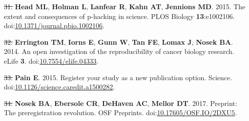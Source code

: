 \documentclass[]{article}
\providecommand{\DIFaddtex}[1]{{\protect\color{blue}\uwave{#1}}} %
\providecommand{\DIFdeltex}[1]{{\protect\color{red}\sout{#1}}}                      %
\providecommand{\DIFaddbegin}{} %
\providecommand{\DIFaddend}{} %
\providecommand{\DIFdelbegin}{} %
\providecommand{\DIFdelend}{} %
\providecommand{\DIFadd}[1]{\texorpdfstring{\DIFaddtex{#1}}{#1}} %
\providecommand{\DIFdel}[1]{\texorpdfstring{\DIFdeltex{#1}}{}} %
\begin{document}
\hypertarget{ref-Head2015}{}
\DIFdelbegin \DIFdel{31. }\DIFdelend \DIFaddbegin \DIFadd{35. }\DIFaddend \textbf{Head ML}, \textbf{Holman L}, \textbf{Lanfear R},
\textbf{Kahn AT}, \textbf{Jennions MD}. 2015. The extent and
consequences of p-hacking in science. PLOS Biology \textbf{13}:e1002106.
doi:\href{https://doi.org/10.1371/journal.pbio.1002106}{10.1371/journal.pbio.1002106}.

\hypertarget{ref-Errington2014}{}
\DIFdelbegin \DIFdel{32. }\DIFdelend \DIFaddbegin \DIFadd{36. }\DIFaddend \textbf{Errington TM}, \textbf{Iorns E}, \textbf{Gunn W},
\textbf{Tan FE}, \textbf{Lomax J}, \textbf{Nosek BA}. 2014. An open
investigation of the reproducibility of cancer biology research. eLife
\textbf{3}.
doi:\href{https://doi.org/10.7554/elife.04333}{10.7554/elife.04333}.

\hypertarget{ref-Pain2015}{}
\DIFdelbegin \DIFdel{33. }\DIFdelend \DIFaddbegin \DIFadd{37. }\DIFaddend \textbf{Pain E}. 2015. Register your study as a new publication
option. Science.
doi:\href{https://doi.org/10.1126/science.caredit.a1500282}{10.1126/science.caredit.a1500282}.

\hypertarget{ref-Nosek2017}{}
\DIFdelbegin \DIFdel{34. }\DIFdelend \DIFaddbegin \DIFadd{38. }\DIFaddend \textbf{Nosek BA}, \textbf{Ebersole CR}, \textbf{DeHaven AC},
\textbf{Mellor DT}. 2017. Preprint: The preregistration revolution. OSF
Preprints.
doi:\href{https://doi.org/10.17605/OSF.IO/2DXU5}{10.17605/OSF.IO/2DXU5}.
\end{document}
